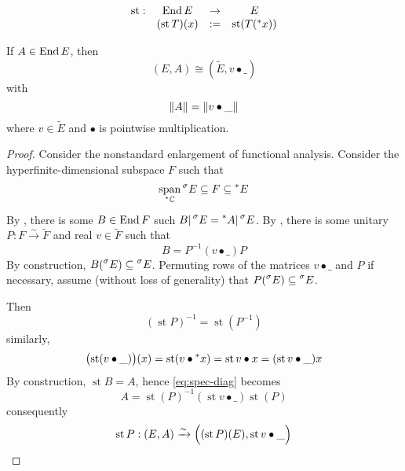 \documentclass{scrartcl}
\newcommand{\hyper}[1]{\prescript{*}{}{#1}}
\newcommand{\standard}[1]{\prescript{\sigma}{}{#1}}
\renewcommand{\define}{:=}
\DeclareMathOperator{\st}{st}
\begin{document}
\begin{defn}
  \[
  \begin{matrix}
   \st: &\End E &\to &E \\
    &(\st T)(x) &\define& \st( T(\hyper x))
  \end{matrix}
  \]
\end{defn}

\begin{theorem}
  If $A\in\operatorname{End} E$, then
  \[
    (E,A)\cong (\tilde E,v\bullet \_)
  \]
  with
  \[
    \left\|A \right\| = \left\|v\bullet \_ \right\|
  \]
  where $v\in \tilde E$ 
  and $\bullet$ is pointwise multiplication. 
\end{theorem}
\begin{proof}
  Consider the nonstandard enlargement of functional analysis.
   Consider the hyperfinite-dimensional subspace $F$ such that
  \[
    \Span_{\hyper \C}\standard E \subseteq F \subseteq \hyper E
  \]
  By , there is some $B\in\operatorname{End} F$ such $B|\standard E = \hyper A|\standard E$. 
  By , there is some unitary $P:F\xrightarrow{\sim} \tilde F$ and real $v\in \tilde F$ such that
  \begin{equation}
    B = P^{-1}(v\bullet\_)P
    \label{eq:spec-diag}
  \end{equation}
  By construction, $B(\standard E) \subseteq \standard E$. Permuting rows of the matrices $v\bullet\_$ and $P$ if necessary, assume (without loss of generality) that $P(\standard E)\subseteq \standard E$. 
  
  Then
  \[
    (\st P)^{-1}=\st(P^{-1})
  \]
  similarly,
  \[
    \bigl(\st(v\bullet\_)\bigr)(x)=\st(v\bullet\hyper x) = \st v\bullet x = (\st v\bullet\_)x
  \]
  By construction, $\st B=A$, hence \cref{eq:spec-diag} becomes
  \[
    A=\st(P)^{-1} (\st v\bullet\_) \st(P)
  \]
  consequently
  \[
    \st P : (E,A) \xrightarrow{\sim} \Bigl( (\st P)(E), \st v\bullet\_\Bigr)
  \]
\end{proof}
\end{document}
